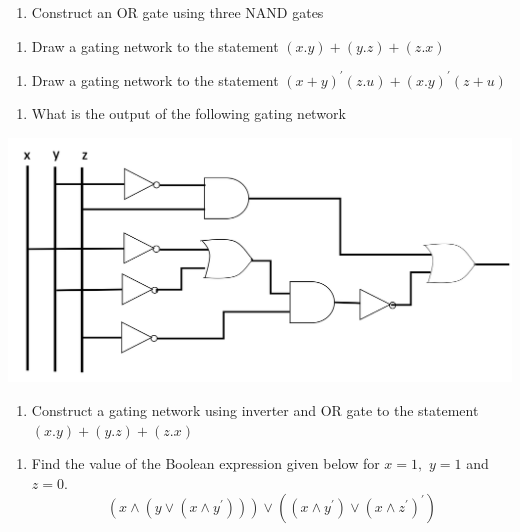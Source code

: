 \documentclass[]{book}
\providecommand{\tightlist}{%
  \setlength{\itemsep}{0pt}\setlength{\parskip}{0pt}}
\begin{document}
\begin{enumerate}
\def\labelenumi{\arabic{enumi}.}
\setcounter{enumi}{1}
\tightlist
\item
  Construct an OR gate using three NAND gates
\end{enumerate}

\begin{enumerate}
\def\labelenumi{\arabic{enumi}.}
\setcounter{enumi}{2}
\tightlist
\item
  Draw a gating network to the statement \((x.y)+(y.z)+(z.x)\)
\end{enumerate}

\begin{enumerate}
\def\labelenumi{\arabic{enumi}.}
\setcounter{enumi}{3}
\tightlist
\item
  Draw a gating network to the statement \((x+y)^\prime(z.u)+(x.y)^\prime(z+u)\)
\end{enumerate}

\begin{enumerate}
\def\labelenumi{\arabic{enumi}.}
\setcounter{enumi}{4}
\tightlist
\item
  What is the output of the following gating network
\end{enumerate}

\begin{center}\includegraphics[width=1\linewidth]{figure/networkQ5} \end{center}

\begin{enumerate}
\def\labelenumi{\arabic{enumi}.}
\setcounter{enumi}{5}
\tightlist
\item
  Construct a gating network using inverter and OR gate to the statement \((x.y)+(y.z)+(z.x)\)
\end{enumerate}

\begin{enumerate}
\def\labelenumi{\arabic{enumi}.}
\setcounter{enumi}{6}
\tightlist
\item
  Find the value of the Boolean expression given below for \(x=1,\) \(y=1\) and \(z=0.\)
  \[(x\land(y\lor(x\land y^\prime)))\lor((x\land y^\prime)\lor (x\land z^\prime)^\prime)\]
\end{enumerate}
\end{document}
